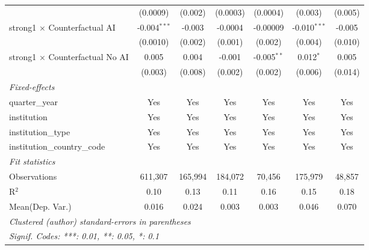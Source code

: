 \begin{tabular}{lcccccc}
                                          & (0.0009)       & (0.002)        & (0.0003)      & (0.0004)      & (0.003)        & (0.005)\\   
   strong1 $\times$ Counterfactual AI     & -0.004$^{***}$ & -0.003         & -0.0004       & -0.00009      & -0.010$^{***}$ & -0.005\\   
                                          & (0.0010)       & (0.002)        & (0.001)       & (0.002)       & (0.004)        & (0.010)\\   
   strong1 $\times$ Counterfactual No AI  & 0.005          & 0.004          & -0.001        & -0.005$^{**}$ & 0.012$^{*}$    & 0.005\\   
                                          & (0.003)        & (0.008)        & (0.002)       & (0.002)       & (0.006)        & (0.014)\\   
   \midrule
   \emph{Fixed-effects}\\
   quarter\_year                          & Yes            & Yes            & Yes           & Yes           & Yes            & Yes\\  
   institution                            & Yes            & Yes            & Yes           & Yes           & Yes            & Yes\\  
   institution\_type                      & Yes            & Yes            & Yes           & Yes           & Yes            & Yes\\  
   institution\_country\_code             & Yes            & Yes            & Yes           & Yes           & Yes            & Yes\\  
   \midrule
   \emph{Fit statistics}\\
   Observations                           & 611,307        & 165,994        & 184,072       & 70,456        & 175,979        & 48,857\\  
   R$^2$                                  & 0.10           & 0.13           & 0.11          & 0.16          & 0.15           & 0.18\\  
Mean(Dep. Var.) & 0.016 & 0.024 & 0.003 & 0.003 & 0.046 & 0.070 \\
   \midrule \midrule
   \multicolumn{7}{l}{\emph{Clustered (author) standard-errors in parentheses}}\\
   \multicolumn{7}{l}{\emph{Signif. Codes: ***: 0.01, **: 0.05, *: 0.1}}\\
\end{tabular}
\par\endgroup
